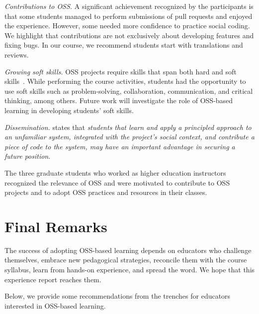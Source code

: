 \documentclass[sigconf]{acmart}
\begin{document}
\begin{description}
\item \textit{Contributions to OSS.}
A significant achievement recognized by the participants is that some students managed to perform submissions of pull requests and enjoyed the experience. However, some needed more confidence to practice social coding.
We highlight that contributions are not exclusively about developing features and fixing bugs. In our course, we recommend students start with translations and reviews.

\item \textit{Growing soft skills.} 
OSS projects require skills that span both hard and soft skills~\cite{liang:skills:2022}. 
%
While performing the course activities, students had the opportunity to use soft skills such as problem-solving, collaboration, communication, and critical thinking, among others. Future work will investigate the role of OSS-based learning in developing students' soft skills.

\item \textit{Dissemination.}
\citet{ryan:icse:seet:2022} states that \textit{students that learn and apply a principled approach to an unfamiliar system, integrated with the project's social context, and contribute a piece of code to the system, may have an important advantage in securing a future position}.

The three graduate students who worked as higher education instructors
recognized the relevance of OSS and were motivated to contribute to OSS projects and to adopt OSS practices and resources in their classes. 

\end{description}

\section{Final Remarks} \label{sec:final:remarks}

The success of adopting OSS-based learning depends on educators who challenge themselves, embrace new pedagogical strategies, reconcile them with the course syllabus, learn from hands-on experience, and spread the word.
%
We hope that this experience report reaches them.

Below, we provide some recommendations 
from the trenches for educators interested in OSS-based learning.
\end{document}
